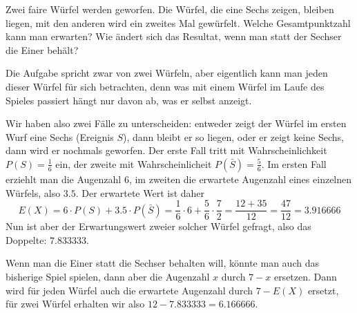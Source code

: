 Zwei faire Würfel werden geworfen. Die Würfel, die eine Sechs
zeigen, bleiben liegen, mit den anderen wird ein zweites Mal gewürfelt.
Welche Gesamtpunktzahl kann man erwarten?
Wie ändert sich das Resultat, wenn man statt der Sechser die Einer
behält?

\begin{loesung}
Die Aufgabe spricht zwar von zwei Würfeln, aber eigentlich kann man
jeden dieser Würfel für sich betrachten, denn was mit einem Würfel
im Laufe des Spieles passiert hängt nur davon ab, was er selbst
anzeigt.

Wir haben also zwei Fälle zu unterscheiden: entweder zeigt der
Würfel im ersten Wurf eine Sechs (Ereignis $S$), dann bleibt er so liegen,
oder er zeigt keine Sechs, dann wird er nochmals geworfen.
Der erste Fall tritt mit Wahrscheinlichkeit $P(S)=\frac16$ ein,
der zweite mit Wahrscheinlicheit $P(\bar{S})=\frac56$. Im ersten Fall
erziehlt man die Augenzahl $6$, im zweiten die erwartete
Augenzahl eines einzelnen Würfels, also $3.5$. Der erwartete
Wert ist daher
\[
E(X)=6\cdot P(S) + 3.5 \cdot P(\bar S)=
\frac16\cdot 6 +\frac56\cdot\frac72=\frac{12+35}{12}=\frac{47}{12}=3.916666
\]
Nun ist aber der Erwartungswert zweier solcher Würfel
gefragt, also das Doppelte: $7.833333$.

Wenn man die Einer statt die Sechser behalten will, könnte man
auch das bisherige Spiel spielen, dann aber die Augenzahl
$x$ durch $7-x$ ersetzen. Dann wird für jeden Würfel auch
die erwartete Augenzahl durch $7-E(X)$ ersetzt, für zwei
Würfel erhalten wir also $12-7.833333 = 6.166666$.


\end{loesung}
